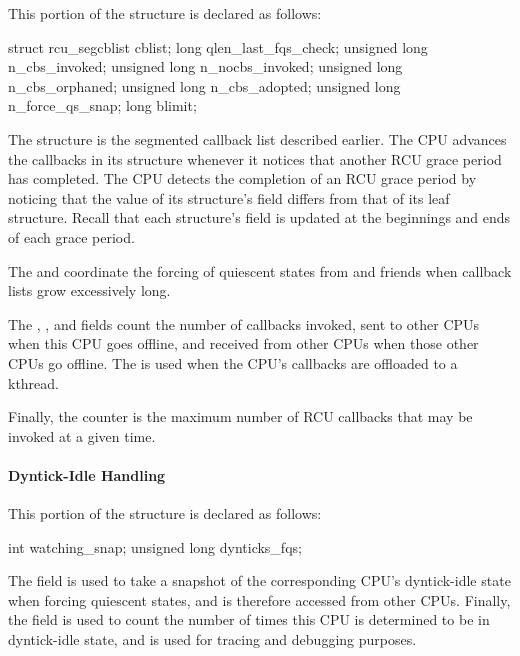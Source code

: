 This portion of the  structure is declared as follows:

\begin{VerbatimN}
	struct rcu_segcblist cblist;
	long qlen_last_fqs_check;
	unsigned long n_cbs_invoked;
	unsigned long n_nocbs_invoked;
	unsigned long n_cbs_orphaned;
	unsigned long n_cbs_adopted;
	unsigned long n_force_qs_snap;
	long blimit;
\end{VerbatimN}

The  structure is the segmented callback list described
earlier.
The CPU advances the callbacks in its  structure
whenever it notices that another RCU grace period has completed.
The CPU
detects the completion of an RCU grace period by noticing that the value
of its  structure's  field differs from that of
its leaf  structure.
Recall that each 
structure's  field is updated at the beginnings and ends of
each grace period.

The  and  coordinate the
forcing of quiescent states from  and friends when
callback lists grow excessively long.

The , , and 
fields count the number of callbacks invoked, sent to other CPUs when
this CPU goes offline, and received from other CPUs when those other
CPUs go offline.
The  is used when the CPU's
callbacks are offloaded to a kthread.

Finally, the  counter is the maximum number of RCU callbacks
that may be invoked at a given time.

\paragraph{Dyntick-Idle Handling}

This portion of the  structure is declared as follows:

\begin{VerbatimN}
		int watching_snap;
		unsigned long dynticks_fqs;
\end{VerbatimN}

The  field is used to take a snapshot of the
corresponding CPU's dyntick-idle state when forcing quiescent states,
and is therefore accessed from other CPUs.
Finally, the
 field is used to count the number of times this CPU
is determined to be in dyntick-idle state, and is used for tracing and
debugging purposes.

